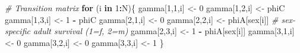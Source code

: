 \documentclass[
  12pt,
]{krantz}
\newenvironment{Shaded}{\begin{snugshade}}{\end{snugshade}}
\newcommand{\CommentTok}[1]{\textcolor[rgb]{0.56,0.35,0.01}{\textit{#1}}}
\newcommand{\ControlFlowTok}[1]{\textcolor[rgb]{0.13,0.29,0.53}{\textbf{#1}}}
\newcommand{\DecValTok}[1]{\textcolor[rgb]{0.00,0.00,0.81}{#1}}
\newcommand{\NormalTok}[1]{#1}
\newcommand{\OtherTok}[1]{\textcolor[rgb]{0.56,0.35,0.01}{#1}}
\newcommand{\SpecialCharTok}[1]{\textcolor[rgb]{0.81,0.36,0.00}{\textbf{#1}}}
\begin{document}
\begin{Shaded}
\begin{Highlighting}[]
\CommentTok{\# Transition matrix}
\ControlFlowTok{for}\NormalTok{ (i }\ControlFlowTok{in} \DecValTok{1}\SpecialCharTok{:}\NormalTok{N)\{}
\NormalTok{  gamma[}\DecValTok{1}\NormalTok{,}\DecValTok{1}\NormalTok{,i] }\OtherTok{\textless{}{-}} \DecValTok{0}
\NormalTok{  gamma[}\DecValTok{1}\NormalTok{,}\DecValTok{2}\NormalTok{,i] }\OtherTok{\textless{}{-}}\NormalTok{ phiC}
\NormalTok{  gamma[}\DecValTok{1}\NormalTok{,}\DecValTok{3}\NormalTok{,i] }\OtherTok{\textless{}{-}} \DecValTok{1} \SpecialCharTok{{-}}\NormalTok{ phiC}
\NormalTok{  gamma[}\DecValTok{2}\NormalTok{,}\DecValTok{1}\NormalTok{,i] }\OtherTok{\textless{}{-}} \DecValTok{0}
\NormalTok{  gamma[}\DecValTok{2}\NormalTok{,}\DecValTok{2}\NormalTok{,i] }\OtherTok{\textless{}{-}}\NormalTok{ phiA[sex[i]]   }\CommentTok{\# sex{-}specific adult survival (1=f, 2=m)}
\NormalTok{  gamma[}\DecValTok{2}\NormalTok{,}\DecValTok{3}\NormalTok{,i] }\OtherTok{\textless{}{-}} \DecValTok{1} \SpecialCharTok{{-}}\NormalTok{ phiA[sex[i]]}
\NormalTok{  gamma[}\DecValTok{3}\NormalTok{,}\DecValTok{1}\NormalTok{,i] }\OtherTok{\textless{}{-}} \DecValTok{0}
\NormalTok{  gamma[}\DecValTok{3}\NormalTok{,}\DecValTok{2}\NormalTok{,i] }\OtherTok{\textless{}{-}} \DecValTok{0}
\NormalTok{  gamma[}\DecValTok{3}\NormalTok{,}\DecValTok{3}\NormalTok{,i] }\OtherTok{\textless{}{-}} \DecValTok{1}
\NormalTok{\}}
\end{Highlighting}
\end{Shaded}
\end{document}
